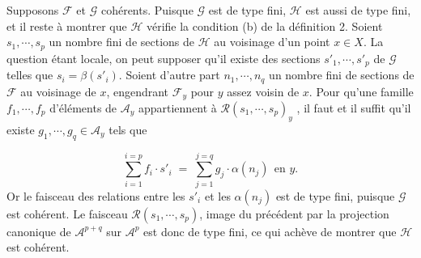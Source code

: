 Supposons $\mathcal{F}$ et $\mathcal{G}$ cohérents. Puisque $\mathcal{G}$ est de type fini, $\mathcal{H}$ est aussi de type fini, et il reste à montrer que $\mathcal{H}$ vérifie la condition (b) de la définition 2. Soient $s_1 , \cdots , s_p$ un nombre fini de sections de $\mathcal{H}$ au voisinage d'un point $x \in X$. La question étant locale, on peut supposer qu'il existe des sections $s'_1, \cdots , s'_p$ de $\mathcal{G}$ telles que $s_i = \beta(s'_i)$. Soient d'autre part $n_1 , \cdots , n_q$ un nombre fini de sections de $\mathcal{F}$ au voisinage de $x$, engendrant $\mathcal{F}_y$ pour $y$ assez voisin de $x$. Pour qu'une famille $f_1 , \cdots , f_p$ d'éléments de $\mathcal{A}_y$ appartiennent à $\mathcal{R}(s_1 , \cdots , s_p)_y$ , il faut et il suffit qu'il existe $g_1 , \cdots , g_q \in \mathcal{A}_y$ tels que

\begin{equation*}
\sum_{i=1}^{i=p} f_i \cdot s'_i \;=\; \sum_{j=1}^{j=q} g_j \cdot \alpha(n_j) \ \ \text{en } y.
\end{equation*}
Or le faisceau des relations entre les $s'_i$ et les $\alpha(n_j)$ est de type fini, puisque $\mathcal{G}$ est cohérent. Le faisceau $\mathcal{R}(s_1 , \cdots , s_p)$, image du précédent par la projection canonique de $\mathcal{A}^{p+q}$ sur $\mathcal{A}^p$ est donc de type fini, ce qui achève de montrer que $\mathcal{H}$ est cohérent.

